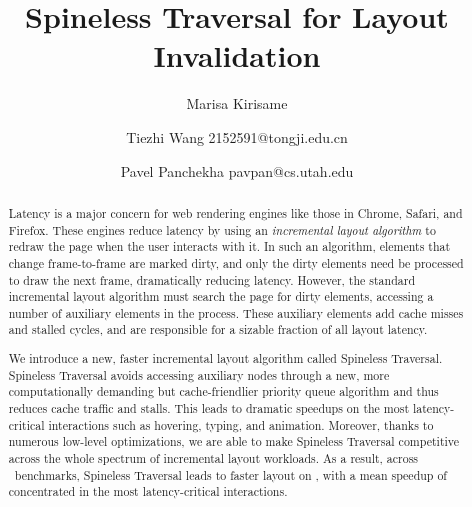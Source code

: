 \documentclass[acmsmall, screen, review, anonymous]{acmart}
\begin{document}
\title[Spineless]{Spineless Traversal for Layout Invalidation}  
\author{Marisa Kirisame}
\author{Tiezhi Wang {2152591@tongji.edu.cn}}
\author{Pavel Panchekha {pavpan@cs.utah.edu}}

\begin{abstract}
Latency is a major concern for web rendering engines
  like those in Chrome, Safari, and Firefox.
These engines reduce latency by using
  an \emph{incremental layout algorithm}
  to redraw the page when
  the user interacts with it.
In such an algorithm,
  elements that change frame-to-frame are marked dirty, and
  only the dirty elements need be processed
  to draw the next frame,
  dramatically reducing latency.
However, the standard incremental layout algorithm
  must search the page for dirty elements,
  accessing a number of auxiliary elements
  in the process.
These auxiliary elements
  add cache misses and stalled cycles,
  and are responsible for a sizable fraction
  of all layout latency.

We introduce a new, faster incremental layout algorithm
  called Spineless Traversal.
Spineless Traversal
  avoids accessing auxiliary nodes
  through a new, 
  more computationally demanding
  but cache-friendlier priority queue algorithm
  and thus reduces cache traffic and stalls.
This leads to dramatic speedups
  on the most latency-critical interactions
  such as hovering, typing, and animation.
Moreover, thanks to numerous low-level optimizations,
  we are able to make Spineless Traversal
  competitive across the whole spectrum of
  incremental layout workloads.
As a result, across \NumFrames~benchmarks,
  Spineless Traversal leads
  to faster layout on \PctFaster,
  with a mean speedup of \MeanSpeedup
  concentrated in the most latency-critical interactions.
\end{abstract}
\end{document}
